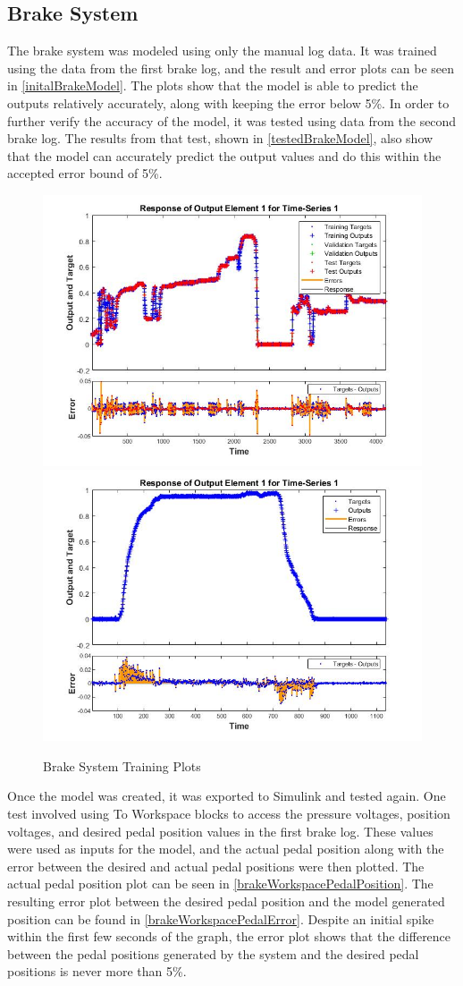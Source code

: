 \documentclass[journal,twoside,web]{ieeecolor}
\begin{document}
\subsection{Brake System}
The brake system was modeled using only the manual log data. It was trained using the data from the first brake log, and the result and error plots can be seen in \autoref{initalBrakeModel}. The plots show that the model is able to predict the outputs relatively accurately, along with keeping the error below 5\%. In order to further verify the accuracy of the model, it was tested using data from the second brake log. The results from that test, shown in \autoref{testedBrakeModel}, also show that the model can accurately predict the output values and do this within the accepted error bound of 5\%.
\begin{figure}[h]
	\centering
		{\includegraphics[width=0.48\linewidth]{figs/img/brake_new_neuralNetworkFig}}
		{\includegraphics[width=0.48\linewidth]{figs/img/brake_new_neuralNetworkFigLog2Test}}
	\caption{Brake System Training Plots}
\end{figure}

Once the model was created, it was exported to Simulink and tested again. One test involved using To Workspace blocks to access the pressure voltages, position voltages, and desired pedal position values in the first brake log. These values were used as inputs for the model, and the actual pedal position along with the error between the desired and actual pedal positions were then plotted. The actual pedal position plot can be seen in \autoref{brakeWorkspacePedalPosition}. The resulting error plot between the desired pedal position and the model generated position can be found in \autoref{brakeWorkspacePedalError}. Despite an initial spike within the first few seconds of the graph, the error plot shows that the difference between the pedal positions generated by the system and the desired pedal positions is never more than 5\%. 
\end{document}
